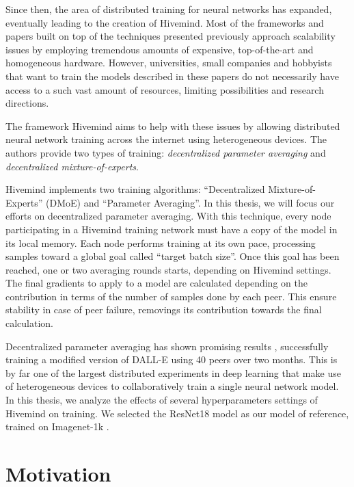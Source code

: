 Since then, the area of distributed training for neural networks has expanded, eventually leading to the creation of Hivemind.
Most of the frameworks and papers built on top of the techniques presented previously approach scalability issues by employing tremendous amounts of expensive, top-of-the-art and homogeneous hardware.
However, universities, small companies and hobbyists that want to train the models described in these papers do not necessarily have access to a such vast amount of resources, limiting possibilities and research directions.

The framework Hivemind \cite{riabinin2020hivemind} aims to help with these issues by allowing distributed neural network training across the internet using heterogeneous devices.
The authors provide two types of training: \textit{decentralized parameter averaging} and \textit{decentralized mixture-of-experts}.

Hivemind implements two training algorithms: ``Decentralized Mixture-of-Experts'' (DMoE) \cite{ryabinin2020learning} and ``Parameter Averaging''.
In this thesis, we will focus our efforts on decentralized parameter averaging.
With this technique, every node participating in a Hivemind training network must have a copy of the model in its local memory.
Each node performs training at its own pace, processing samples toward a global goal called ``target batch size''.
Once this goal has been reached, one or two averaging rounds starts, depending on Hivemind settings.
The final gradients to apply to a model are calculated depending on the contribution in terms of the number of samples done by each peer.
This ensure stability in case of peer failure, removings its contribution towards the final calculation.

Decentralized parameter averaging has shown promising results \cite{learning30:online}, successfully training a modified version of DALL-E using 40 peers over two months.
This is by far one of the largest distributed experiments in deep learning that make use of heterogeneous devices to collaboratively train a single neural network model.
In this thesis, we analyze the effects of several hyperparameters settings of Hivemind on training.
We selected the ResNet18 \cite{he2015deep} model as our model of reference, trained on Imagenet-1k \cite{deng2009imagenet}.

\section{Motivation}

